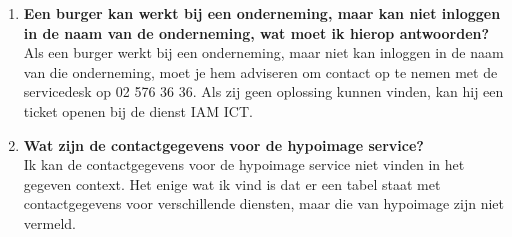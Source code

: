\begin{enumerate}
    
    \item \textbf{Een burger kan werkt bij een onderneming, maar kan niet inloggen in de naam van de onderneming, wat moet ik hierop antwoorden?} \\
    Als een burger werkt bij een onderneming, maar niet kan inloggen in de naam van die onderneming, moet je hem adviseren om contact op te nemen met de servicedesk op 02 576 36 36. Als zij geen oplossing kunnen vinden, kan hij een ticket openen bij de dienst IAM ICT.
    
    \item \textbf{Wat zijn de contactgegevens voor de hypoimage service?} \\
    Ik kan de contactgegevens voor de hypoimage service niet vinden in het gegeven context. Het enige wat ik vind is dat er een tabel staat met contactgegevens voor verschillende diensten, maar die van hypoimage zijn niet vermeld.
\end{enumerate}

